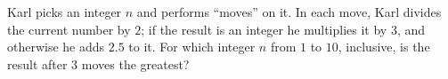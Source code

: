 Karl picks an integer $n$ and performs ``moves'' on it. In each move, Karl divides the current number by $2$; if the result is an integer he multiplies it by $3$, and otherwise he adds $2.5$ to it. For which integer $n$ from $1$ to $10$, inclusive, is the result after $3$ moves the greatest?

